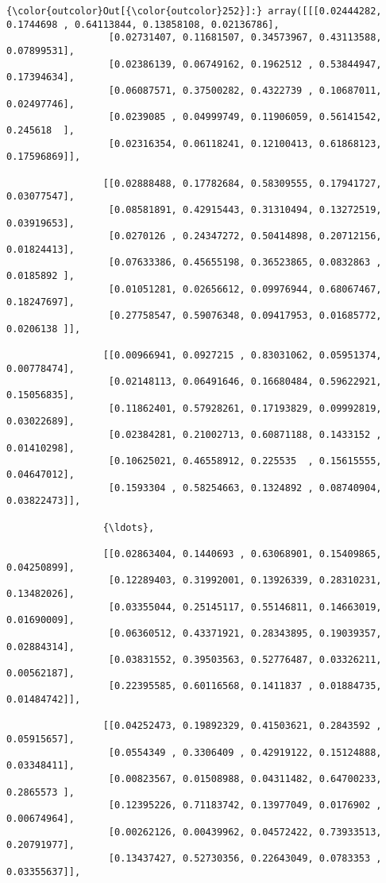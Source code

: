\documentclass[11pt]{article}
\begin{document}
\begin{Verbatim}[commandchars=\\\{\}]
{\color{outcolor}Out[{\color{outcolor}252}]:} array([[[0.02444282, 0.1744698 , 0.64113844, 0.13858108, 0.02136786],
                  [0.02731407, 0.11681507, 0.34573967, 0.43113588, 0.07899531],
                  [0.02386139, 0.06749162, 0.1962512 , 0.53844947, 0.17394634],
                  [0.06087571, 0.37500282, 0.4322739 , 0.10687011, 0.02497746],
                  [0.0239085 , 0.04999749, 0.11906059, 0.56141542, 0.245618  ],
                  [0.02316354, 0.06118241, 0.12100413, 0.61868123, 0.17596869]],
          
                 [[0.02888488, 0.17782684, 0.58309555, 0.17941727, 0.03077547],
                  [0.08581891, 0.42915443, 0.31310494, 0.13272519, 0.03919653],
                  [0.0270126 , 0.24347272, 0.50414898, 0.20712156, 0.01824413],
                  [0.07633386, 0.45655198, 0.36523865, 0.0832863 , 0.0185892 ],
                  [0.01051281, 0.02656612, 0.09976944, 0.68067467, 0.18247697],
                  [0.27758547, 0.59076348, 0.09417953, 0.01685772, 0.0206138 ]],
          
                 [[0.00966941, 0.0927215 , 0.83031062, 0.05951374, 0.00778474],
                  [0.02148113, 0.06491646, 0.16680484, 0.59622921, 0.15056835],
                  [0.11862401, 0.57928261, 0.17193829, 0.09992819, 0.03022689],
                  [0.02384281, 0.21002713, 0.60871188, 0.1433152 , 0.01410298],
                  [0.10625021, 0.46558912, 0.225535  , 0.15615555, 0.04647012],
                  [0.1593304 , 0.58254663, 0.1324892 , 0.08740904, 0.03822473]],
          
                 {\ldots},
          
                 [[0.02863404, 0.1440693 , 0.63068901, 0.15409865, 0.04250899],
                  [0.12289403, 0.31992001, 0.13926339, 0.28310231, 0.13482026],
                  [0.03355044, 0.25145117, 0.55146811, 0.14663019, 0.01690009],
                  [0.06360512, 0.43371921, 0.28343895, 0.19039357, 0.02884314],
                  [0.03831552, 0.39503563, 0.52776487, 0.03326211, 0.00562187],
                  [0.22395585, 0.60116568, 0.1411837 , 0.01884735, 0.01484742]],
          
                 [[0.04252473, 0.19892329, 0.41503621, 0.2843592 , 0.05915657],
                  [0.0554349 , 0.3306409 , 0.42919122, 0.15124888, 0.03348411],
                  [0.00823567, 0.01508988, 0.04311482, 0.64700233, 0.2865573 ],
                  [0.12395226, 0.71183742, 0.13977049, 0.0176902 , 0.00674964],
                  [0.00262126, 0.00439962, 0.04572422, 0.73933513, 0.20791977],
                  [0.13437427, 0.52730356, 0.22643049, 0.0783353 , 0.03355637]],
          

\end{Verbatim}
\end{document}
